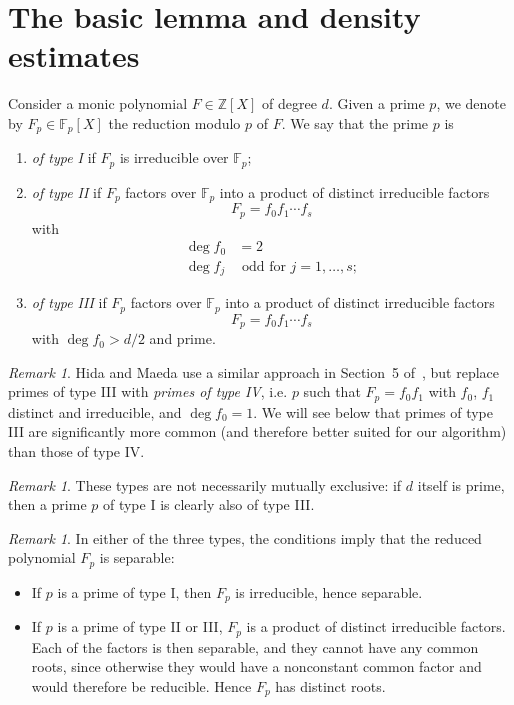 \documentclass[11pt]{article}
\theoremstyle{plain}
\theoremstyle{definition}
\theoremstyle{remark}
\newtheorem{remark}[theorem]{Remark}
\numberwithin{equation}{section}
\newcommand{\ZZ}{\mathbb{Z}}
\newcommand{\FF}{\mathbb{F}}
\begin{document}
\section{The basic lemma and density estimates}
\label{sect:density}

Consider a monic polynomial $F\in\ZZ[X]$ of degree $d$.
Given a prime $p$, we denote by
$F_p\in\FF_p[X]$ the reduction modulo $p$ of $F$.  We say that the prime
$p$ is
\begin{enumerate}
  \item \emph{of type I} if $F_p$ is irreducible over $\FF_p$;
  \item \emph{of type II} if $F_p$ factors over $\FF_p$ into a product of
    distinct irreducible factors
    \begin{equation*}
      F_p=f_0f_1\cdots f_s
    \end{equation*}
    with
    \begin{align*}
      \deg f_0 &= 2\\
      \deg f_j &\text{ odd for }j=1,\ldots,s;
    \end{align*}
  \item \emph{of type III} if $F_p$ factors over $\FF_p$ into a product of
    distinct irreducible factors
    \begin{equation*}
      F_p=f_0f_1\cdots f_s
    \end{equation*}
    with $\deg f_0>d/2$ and prime.
\end{enumerate}

\begin{remark}\label{rmk:type4}
  Hida and Maeda use a similar approach in Section~5 of~\cite{HidaMaeda}, but 
  replace primes of type III with
  \emph{primes of type IV}, i.e. $p$ such that $F_p=f_0f_1$ with $f_0$, $f_1$
  distinct and irreducible, and $\deg f_0=1$.  We will see below that primes
  of type III are significantly more common (and therefore better suited for
  our algorithm) than those of type IV.
\end{remark}

\begin{remark}
These types are not necessarily mutually exclusive: if $d$ itself is
prime, then a prime $p$ of type I is clearly also of type III.
\end{remark}

\begin{remark}
In either of the three types, the conditions imply that the reduced polynomial
$F_p$ is separable:
\begin{itemize}
  \item If $p$ is a prime of type I, then $F_p$ is irreducible, hence
    separable.
  \item If $p$ is a prime of type II or III, $F_p$ is a product of distinct
    irreducible factors.  Each of the factors is then separable, and they 
    cannot have any common roots, since otherwise they would have a
    nonconstant common factor and would therefore be reducible.  Hence $F_p$
    has distinct roots.
\end{itemize}
\end{remark}
\end{document}
